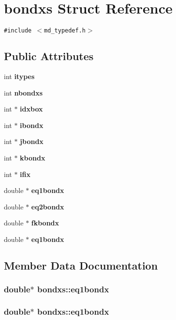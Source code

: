 \section{bondxs Struct Reference}
\label{structbondxs}
{\tt \#include $<$md\_\-typedef.h$>$}

\subsection*{Public Attributes}
\begin{CompactItemize}
\item 
int {\bf itypes}
\item 
int {\bf nbondxs}
\item 
int $\ast$ {\bf idxbox}
\item 
int $\ast$ {\bf ibondx}
\item 
int $\ast$ {\bf jbondx}
\item 
int $\ast$ {\bf kbondx}
\item 
int $\ast$ {\bf ifix}
\item 
double $\ast$ {\bf eq1bondx}
\item 
double $\ast$ {\bf eq2bondx}
\item 
double $\ast$ {\bf fkbondx}
\item 
double $\ast$ {\bf eq1bondx}
\end{CompactItemize}


\subsection{Member Data Documentation}
\subsubsection{\setlength{\rightskip}{0pt plus 5cm}double$\ast$ {\bf bondxs::eq1bondx}}\label{structbondxs_c162b1f0099bd6316e98c0ac21bc89b5}


\subsubsection{\setlength{\rightskip}{0pt plus 5cm}double$\ast$ {\bf bondxs::eq1bondx}}\label{structbondxs_c162b1f0099bd6316e98c0ac21bc89b5}


